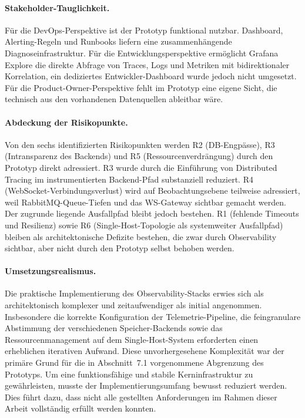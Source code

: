 \paragraph{Stakeholder-Tauglichkeit.}
Für die DevOps-Perspektive ist der Prototyp funktional nutzbar. Dashboard, Alerting-Regeln und Runbooks liefern eine zusammenhängende Diagnoseinfrastruktur. Für die Entwicklungsperspektive ermöglicht Grafana Explore die direkte Abfrage von Traces, Logs und Metriken mit bidirektionaler Korrelation, ein dediziertes Entwickler-Dashboard wurde jedoch nicht umgesetzt. Für die Product-Owner-Perspektive fehlt im Prototyp eine eigene Sicht, die technisch aus den vorhandenen Datenquellen ableitbar wäre.

\paragraph{Abdeckung der Risikopunkte.}
Von den sechs identifizierten Risikopunkten werden R2 (DB-Engpässe), R3 (Intransparenz des Backends) und R5 (Ressourcenverdrängung) durch den Prototyp direkt adressiert. R3 wurde durch die Einführung von Distributed Tracing im instrumentierten Backend-Pfad substanziell reduziert. R4 (WebSocket-Verbindungsverlust) wird auf Beobachtungsebene teilweise adressiert, weil RabbitMQ-Queue-Tiefen und das WS-Gateway sichtbar gemacht werden. Der zugrunde liegende Ausfallpfad bleibt jedoch bestehen. R1 (fehlende Timeouts und Resilienz) sowie R6 (Single-Host-Topologie als systemweiter Ausfallpfad) bleiben als architektonische Defizite bestehen, die zwar durch Observability sichtbar, aber nicht durch den Prototyp selbst behoben werden.

\paragraph{Umsetzungsrealismus.}
Die praktische Implementierung des Observability-Stacks erwies sich als architektonisch komplexer und zeitaufwendiger als initial angenommen. Insbesondere die korrekte Konfiguration der Telemetrie-Pipeline, die feingranulare Abstimmung der verschiedenen Speicher-Backends sowie das Ressourcenmanagement auf dem Single-Host-System erforderten einen erheblichen iterativen Aufwand. Diese unvorhergesehene Komplexität war der primäre Grund für die in Abschnitt~7.1 vorgenommene Abgrenzung des Prototyps. Um eine funktionsfähige und stabile Kerninfrastruktur zu gewährleisten, musste der Implementierungsumfang bewusst reduziert werden. Dies führt dazu, dass nicht alle gestellten Anforderungen im Rahmen dieser Arbeit vollständig erfüllt werden konnten.

